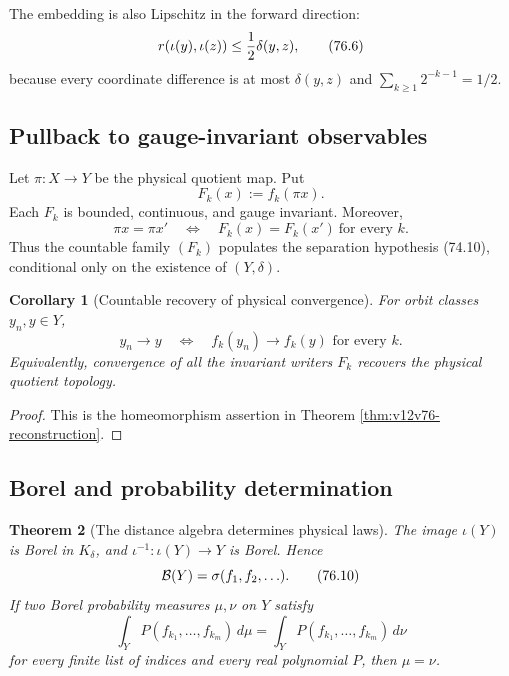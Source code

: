 \documentclass[11pt]{article}
\newtheorem{theorem}{Theorem}[section]
\newtheorem{corollary}[theorem]{Corollary}
\theoremstyle{remark}
\begin{document}
The embedding is also Lipschitz in the forward direction:
\begin{equation}
 r(\iota(y),\iota(z))
 \leq {1\over2}\delta(y,z),                                 \tag{76.6}
\end{equation}
because every coordinate difference is at most \(\delta(y,z)\) and
\(\sum_{k\geq1}2^{-k-1}=1/2\).

\subsection{Pullback to gauge-invariant observables}

Let \(\pi:X\to Y\) be the physical quotient map.  Put
\begin{equation}
                         F_k(x):=f_k(\pi x).                 \tag{76.7}
\end{equation}
Each \(F_k\) is bounded, continuous, and gauge invariant.  Moreover,
\begin{equation}
 \pi x=\pi x'
 \quad\Longleftrightarrow\quad
 F_k(x)=F_k(x')\ \text{for every }k.                        \tag{76.8}
\end{equation}
Thus the countable family \((F_k)\) populates the separation
hypothesis (74.10), conditional only on the existence of
\((Y,\delta)\).

\begin{corollary}[Countable recovery of physical convergence]
\label{cor:v12v76-convergence}
For orbit classes \(y_n,y\in Y\),
\begin{equation}
 y_n\longrightarrow y
 \quad\Longleftrightarrow\quad
 f_k(y_n)\longrightarrow f_k(y)
 \text{ for every }k.                                      \tag{76.9}
\end{equation}
Equivalently, convergence of all the invariant writers \(F_k\)
recovers the physical quotient topology.
\end{corollary}

\begin{proof}
This is the homeomorphism assertion in Theorem
\ref{thm:v12v76-reconstruction}.
\end{proof}

\subsection{Borel and probability determination}

\begin{theorem}[The distance algebra determines physical laws]
\label{thm:v12v76-law-determination}
The image \(\iota(Y)\) is Borel in \(K_\delta\), and
\(\iota^{-1}:\iota(Y)\to Y\) is Borel.  Hence
\begin{equation}
 {\cal B}(Y)=\sigma(f_1,f_2,\ldots).                         \tag{76.10}
\end{equation}
If two Borel probability measures \(\mu,\nu\) on \(Y\) satisfy
\begin{equation}
 \int_Y P(f_{k_1},\ldots,f_{k_m})\,d\mu
 =
 \int_Y P(f_{k_1},\ldots,f_{k_m})\,d\nu                     \tag{76.11}
\end{equation}
for every finite list of indices and every real polynomial \(P\),
then \(\mu=\nu\).
\end{theorem}
\end{document}
